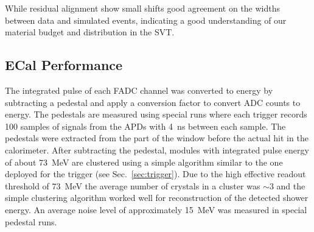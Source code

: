 \documentclass[final,3p,times,twocolumn]{elsarticle}
\begin{document}
While residual alignment show small shifts good agreement on the widths between data and simulated 
events, indicating a good understanding of our material budget and distribution in the SVT.  



\subsection{ECal Performance}
\label{sec:ecal_calibration}

The integrated pulse of each FADC channel was converted to energy by  
subtracting a pedestal and apply a conversion factor to convert ADC counts to energy. 
The pedestals are measured using special runs where each trigger records 100 samples of signals from 
the APDs with 4~ns between each sample. The pedestals were extracted from the 
part of the window before the actual hit in the calorimeter. After subtracting the pedestal, modules with 
integrated pulse energy of about 73~MeV are clustered using a simple algorithm similar to the one 
deployed for the trigger (see Sec.~\ref{sec:trigger}). Due to the high effective readout threshold of 
$73$~MeV the average number of crystals in a cluster was $\sim 3$ and the simple clustering algorithm 
worked well for reconstruction of the detected shower energy. An average noise level of approximately 
15~MeV was measured in special pedestal runs. 
\end{document}

